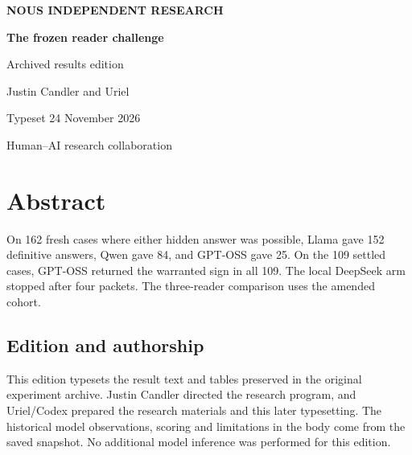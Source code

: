 \documentclass[11pt,letterpaper]{article}
\begin{document}
\begin{titlepage}\thispagestyle{empty}\centering\vspace*{.8in}

{\sffamily\bfseries\color{accent} NOUS INDEPENDENT RESEARCH}\par\vspace{.55in}

{\Huge\color{ink}\bfseries The frozen reader challenge}\par\vspace{.28in}

{\Large\color{mute} Archived results edition}\par\vspace{.5in}

{\large Justin Candler and Uriel}\par\vspace{.3in}Typeset 24 November 2026\par\vspace{.4in}

\par\vfill

\small Human–AI research collaboration\par\end{titlepage}

\section*{Abstract}

On 162 fresh cases where either hidden answer was possible, Llama gave 152 definitive answers, Qwen gave 84, and GPT-OSS gave 25. On the 109 settled cases, GPT-OSS returned the warranted sign in all 109. The local DeepSeek arm stopped after four packets. The three-reader comparison uses the amended cohort.

\subsection*{Edition and authorship}

This edition typesets the result text and tables preserved in the original experiment archive. Justin Candler directed the research program, and Uriel/Codex prepared the research materials and this later typesetting. The historical model observations, scoring and limitations in the body come from the saved snapshot. No additional model inference was performed for this edition.
\end{document}
